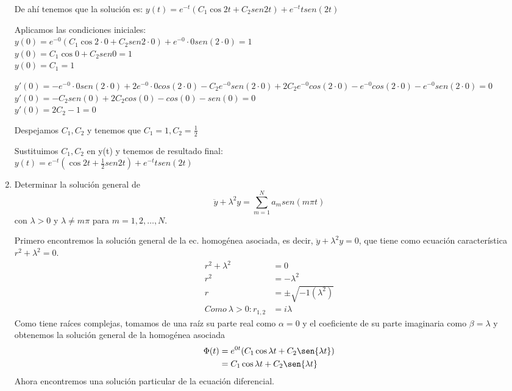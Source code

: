 \documentclass{article}
\begin{document}
\begin{enumerate}
{            De ahí tenemos que la solución es: $y(t) = e^{-t}(C_1\cos{2t}+C_2 sen{2t}) + e^{-t}tsen(2t)$
            
            Aplicamos las condiciones iniciales:\\
            $y(0) = e^{-0}(C_1\cos{2\cdot0}+C_2 sen{2\cdot0}) + e^{-0}\cdot0sen(2\cdot 0) = 1$\\
            $y(0) = C_1\cos{0}+C_2 sen{0} = 1$\\
            $y(0) = C_1 = 1$
            
            $y'(0) = -e^{-0}\cdot0sen(2\cdot 0) + 2e^{-0}\cdot0cos(2\cdot 0)  
            -C_2e^{-0}sen(2\cdot 0) + 2C_2e^{-0}cos(2\cdot 0)         -e^{-0}cos(2\cdot 0) -e^{-0}sen(2\cdot 0)= 0$\\
            $y'(0) = -C_2sen(0) + 2C_2cos(0) -cos(0) -sen(0)= 0$\\
            $y'(0) =  2C_2 -1 = 0$
            
            Despejamos $C_1, C_2$ y tenemos que $C_1 = 1, C_2 = \frac{1}{2}$
            
            Sustituimos $C_1, C_2$ en y(t) y tenemos de resultado final:\\
            $y(t) = e^{-t}(\cos{2t}+ \frac{1}{2}sen{2t}) + e^{-t}tsen(2t)$\\
        }
        \item {
            Determinar la solución general de
            $$\ddot{y}+\lambda^2y=\sum_{m=1}^{N}{a_m sen{(m\pi t)}}$$
            con $\lambda>0$ y $\lambda\neq m\pi$ para $m=1,2,\ldots,N$.

            \color{azul}
            Primero encontremos la solución general de la ec. homogénea asociada, es decir,
            $\ddot{y}+\lambda^2y=0$, que tiene como ecuación característica $r^2+\lambda^2=0$.
            \begin{align*}
            r^2+\lambda^2 &= 0 \\
            r^2 &= -\lambda^2 \\
            r &= \pm\sqrt{-1 (\lambda^2)} \\
            Como \ \lambda > 0:
            r_{1,2} &= i\lambda
            \end{align*}
            Como tiene raíces complejas, tomamos de una raíz su parte real como $\alpha=0$ y el
            coeficiente de su parte imaginaria como $\beta=\lambda$ y obtenemos la solución general de 
            la homogénea asociada
            \begin{align*}
            \Phi(t) &= e^{0t}(C_1\cos{\lambda t}+C_2\sen{\lambda t}) \\
            &= C_1\cos{\lambda t}+C_2\sen{\lambda t}
            \end{align*}
            Ahora encontremos una solución particular de la ecuación diferencial.
            
}
\end{enumerate}
\end{document}
